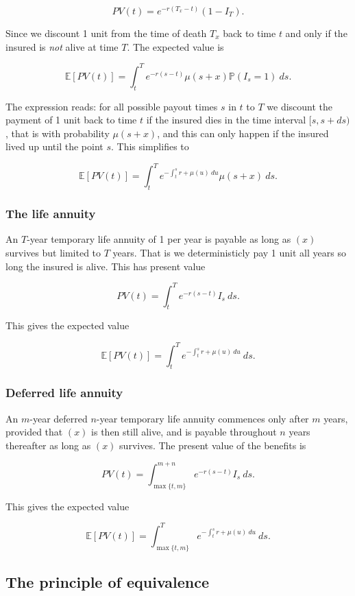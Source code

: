 \documentclass[a4paper,10pt,openany]{book}
\begin{document}
\[
PV(t)=e^{-r(T_x-t)}(1-I_T).
\]

Since we discount 1 unit from the time of death \(T_x\) back to time \(t\) and only if the insured is \emph{not} alive at time \(T\). The expected value is

\[
\mathbb E[PV(t)]=\int_t^Te^{-r(s-t)}\mu(s+x)\mathbb P(I_s=1) \ ds.
\]

The expression reads: for all possible payout times \(s\) in \(t\) to \(T\) we discount the payment of 1 unit back to time \(t\) if the insured dies in the time interval \([s,s+ds)\), that is with probability \(\mu(s+x)\), and this can only happen if the insured lived up until the point \(s\). This simplifies to

\[
\mathbb E[PV(t)]=\int_t^Te^{-\int_t^sr+\mu(u)\ du}\mu(s+x) \ ds.
\]

\hypertarget{the-life-annuity}{%
\subsubsection{The life annuity}\label{the-life-annuity}}

An \(T\)-year temporary life annuity of 1 per year is payable as long as \((x)\) survives but limited to \(T\) years. That is we deterministicly pay 1 unit all years so long the insured is alive. This has present value

\[
PV(t)=\int_t^Te^{-r(s-t)} I_s\ ds.
\]

This gives the expected value

\[
\mathbb E[PV(t)]=\int_t^T e^{-\int_t^sr+\mu(u)\ du}\ ds.
\]

\hypertarget{deferred-life-annuity}{%
\subsubsection{Deferred life annuity}\label{deferred-life-annuity}}

An \(m\)-year deferred \(n\)-year temporary life annuity commences only after \(m\) years, provided that \((x)\) is then still alive, and is payable throughout \(n\) years thereafter as long as \((x)\) survives. The present value of the benefits is

\[
PV(t)=\int_{\max\{t,m\}}^{m+n} e^{-r(s-t)}I_s\ ds.
\]

This gives the expected value

\[
\mathbb E[PV(t)]=\int_{\max\{t,m\}}^T e^{-\int_t^sr+\mu(u)\ du}\ ds.
\]

\hypertarget{the-principle-of-equivalence}{%
\subsection{The principle of equivalence}\label{the-principle-of-equivalence}}
\end{document}
